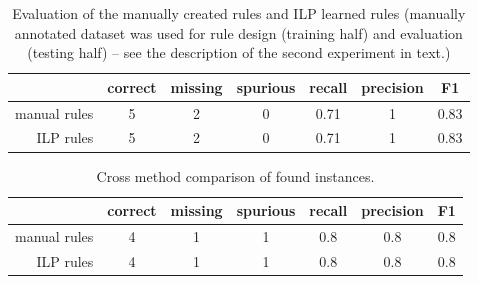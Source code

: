 \begin{table}
	\centering
	\begin{tabular}{|r|c|c|c|c|c|c|}
		\hline
		 & correct & missing & spurious & recall & precision & F1\\
		\hline
		manual rules & 5 & 2 & 0 & 0.71 & 1 & 0.83\\
		\hline
		ILP rules & 5 & 2 & 0 & 0.71 & 1 & 0.83\\
		\hline
	\end{tabular}
	\caption{Evaluation of the manually created rules and ILP learned rules (manually annotated dataset was used for rule design (training half) and evaluation (testing half) -- see the description of the second experiment in text.)}
	\label{tab:ch3_damage_manual_eval}
\end{table}





\begin{table}
	\centering
	\begin{tabular}{|r|c|c|c|c|c|c|}
		\hline
		 & correct & missing & spurious & recall & precision & F1\\
		\hline
		manual rules & 4 & 1 & 1 & 0.8 & 0.8 & 0.8\\
		\hline
		ILP rules & 4 & 1 & 1 & 0.8 & 0.8 & 0.8\\
		\hline
	\end{tabular}
	\caption{Cross method comparison of found instances.}
	\label{tab:ch3_damage_cross_method}
\end{table}



